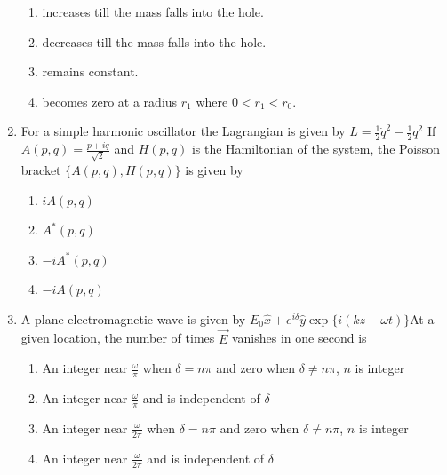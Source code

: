 \documentclass[journal,12pt,onecolumn]{IEEEtran}
\theoremstyle{remark}
\begin{document}
\begin{enumerate}
\begin{figure}[h!]
    \label{fig:placeholder}
\end{figure}
\hfill{}
\begin{enumerate}
    \item increases till the mass falls into the hole.
    \item decreases till the mass falls into the hole.
    \item remains constant.
    \item becomes zero at a radius $r_{1}$ where $0 < r_{1} < r_{0}$.
\end{enumerate}

\item For a simple harmonic oscillator the Lagrangian is given by $L = \tfrac{1}{2} \dot{q}^2 - \tfrac{1}{2} q^2$ If $A(p,q) = \tfrac{p + i q}{\sqrt{2}}$ and $H(p,q)$ is the Hamiltonian of the system, the Poisson bracket $\{ A(p,q), H(p,q) \}$ is given by 
\hfill{}
\begin{enumerate}
    \item $i A(p,q)$
    \item $A^{*}(p,q)$
    \item $-i A^{*}(p,q)$
    \item $-i A(p,q)$
\end{enumerate}

\item A plane electromagnetic wave is given by $E_{0}  \hat{x} + e^{i \delta} \hat{y}  \exp \{ i(k z - \omega t) \}$At a given location, the number of times $\vec{E}$ vanishes in one second is
\hfill{}
\begin{enumerate}
    \item An integer near $\frac{\omega}{\pi}$ when $\delta = n\pi$ and zero when $\delta \neq n\pi$, $n$ is integer
    \item An integer near $\frac{\omega}{\pi}$ and is independent of $\delta$
    \item An integer near $\frac{\omega}{2\pi}$ when $\delta = n\pi$ and zero when $\delta \neq n\pi$, $n$ is integer
    \item An integer near $\frac{\omega}{2\pi}$ and is independent of $\delta$
\end{enumerate}



\end{enumerate}
\end{document}
